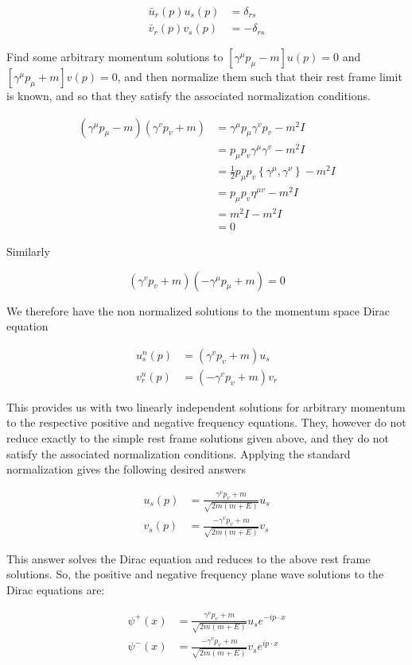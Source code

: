 \documentclass[main.tex]{subfiles}
\begin{document}
\begin{enumerate}
    $$
    \begin{aligned}
    \bar{u}_r(p) u_s(p) &= \delta_{r s} \\
    \bar{v}_r(p) v_s(p) &=- \delta_{r s}
    \end{aligned}
    $$

    Find some arbitrary momentum solutions to $\left[\gamma^\mu p_\mu-m\right] u(p)=0$ and $\left[\gamma^\mu p_\mu+m\right] v(p)=0$, and then normalize them such that their rest frame limit is known, and so that they satisfy the associated normalization conditions.

    $$
    \begin{aligned}
    \left(\gamma^\mu p_\mu-m\right)\left(\gamma^v p_v+m\right) &= \gamma^\mu p_\mu \gamma^v p_v-m^2 I\\
    & = p_\mu p_v \gamma^\mu \gamma^v-m^2 I \\
    & = \frac{1}{2} p_\mu p_v\left\{\gamma^\mu, \gamma^\nu\right\}-m^2 I \\
    & = p_\mu p_v \eta^{\mu v}-m^2 I\\
    & = m^2 I-m^2 I \\
    & = 0
    \end{aligned}
    $$

    Similarly

    $$
    \left(\gamma^v p_v+m\right)\left(-\gamma^\mu p_\mu+m\right)=0
    $$

    We therefore have the non normalized solutions to the momentum space Dirac equation

    $$
    \begin{aligned}
    u_s^n(p) &= \left(\gamma^v p_v+m\right) u_s \\
    v_r^n(p) &= \left(-\gamma^v p_v+m\right) v_r
    \end{aligned}
    $$

    This provides us with two linearly independent solutions for arbitrary momentum to the respective positive and negative frequency equations. They, however do not reduce exactly to the simple rest frame solutions given above, and they do not satisfy the associated normalization conditions. Applying the standard normalization gives the following desired answers

    $$
    \begin{aligned}
    u_s(p) &= \frac{\gamma^v p_v+m}{\sqrt{2 m(m+E)}} u_s \\
    v_s(p) &= \frac{-\gamma^v p_v+m}{\sqrt{2 m(m+E)}} v_s
    \end{aligned}
    $$

    This answer solves the Dirac equation and reduces to the above rest frame solutions. So, the positive and negative frequency plane wave solutions to the Dirac equations are:

    $$
    \begin{aligned}
    \psi^{+}(x) &= \frac{\gamma^v p_v+m}{\sqrt{2 m(m+E)}} u_s e^{-i p \cdot x} \\
    \psi^{-}(x) &= \frac{-\gamma^v p_v+m}{\sqrt{2 m(m+E)}} v_s e^{i p \cdot x}
    \end{aligned}
    $$
    
    
\end{enumerate}
\end{document}
